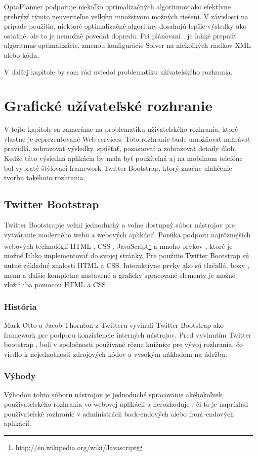 OptaPlanner podporuje niekoľko optimalizačných algoritmov ako efektívne prehrýzť týmto neuveriteľne veľkým množstvom možných riešení. V závislosti na prípade použitia, niektoré optimalizačné algoritmy dosahujú lepšie výsledky ako ostatné, ale to je nemožné povedať dopredu. Pri plánovaní , je ľahké prepnúť algoritmus optimalizácie, zmenou konfigurácie Solver na niekoľkých riadkov XML alebo kódu.


V ďalšej kapitole by som rád uviedol problematiku užívateľského rozhrania.
\chapter{Grafické užívateľské rozhranie}
V tejto kapitole sa zameráme na problematiku užívateľského rozhrania, ktoré vlastne je reprezentované Web services. Toto rozhranie bude umožňovať nahrávať pravidlá, zobrazovať výsledky, spúšťať, pozastovať a zobrazovať detaily úloh. Keďže táto výsledná aplikácia by mala byť použíteľná aj na mobilnom telefóne bol vybratý štýlovací framework Twitter Bootstrap, ktorý značne uľahčenie tvorbu takéhoto rozhrania.

\section{Twitter Bootstrap}
Twitter Bootstrapje veľmi jednoduchý a voľne dostupný súbor nástrojov pre vytváranie moderného webu a webových aplikácií.\cite{boot} Ponúka podporu najrôznejších webových technológií HTML , CSS , JavaScript\footnote{http://en.wikipedia.org/wiki/Javascript} a mnoho prvkov , ktoré je možné ľahko implementovať do svojej stránky. Pre použitie Twitter Bootstrap sú nutné základné znalosti HTML a CSS. Interaktívne prvky ako sú tlačidlá, boxy , menu a ďalšie kompletne nastavené a graficky spracované elementy je možné vložiť iba pomocou HTML a CSS .

\subsection{História}
Mark Otto a Jacob Thornton z Twitteru vyvinuli Twitter Bootstrap ako framework pre podporu konzistencie interných nástrojov. Pred vyvinutím Twitter bootstrap , boli v spoločnosti používané rôzne knižnice pre vývoj rozhrania, čo viedlo k nejednotnosti zdrojových kódov a vysokým nákladom na údržbu.


\subsection{Výhody}
Výhodou tohto súboru nástrojov je jednoduché spracovanie akéhokoľvek používateľského rozhrania vo webovej aplikácii a nerozhoduje , či to je napríklad používateľské rozhranie v administrácii back-endových alebo front-endových aplikácií.

